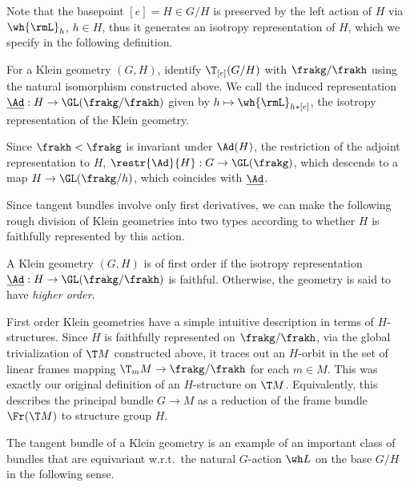 Note that the basepoint $[e]=H\in G\slash H$ is preserved by the left action of $H$ via $\wh{\rmL}_h$, $h\in H$, thus it generates an isotropy representation of $H$, which we specify in the following definition.

\begin{defn}
    For a Klein geometry $(G,H)$, identify $\T_{[e]}(G\slash H)$ with $\frakg\slash\frakh$ using the natural isomorphism constructed above. We call the induced representation $\underline{\Ad}:H\to \GL(\frakg\slash\frakh)$ given by $h\mapsto \wh{\rmL}_{h\ast [e]}$, the isotropy representation of the Klein geometry.

    Since $\frakh<\frakg$ is invariant under $\Ad(H)$, the restriction of the adjoint representation to $H$, $\restr{\Ad}{H}:G\to \GL(\frakg)$, which descends to a map $H\to \GL(\frakg\slash h)$, which coincides with $\underline{\Ad}$.
\end{defn}

Since tangent bundles involve only first derivatives, we can make the following rough division of Klein geometries into two types according to whether $H$ is faithfully represented by this action.

\begin{defn}
    A Klein geometry $(G,H)$ is of first order if the isotropy representation $\underline{\Ad}:H\to \GL(\frakg\slash\frakh)$ is faithful. Otherwise, the geometry is said to have \emph{higher order}.
\end{defn}

\begin{rem}
    First order Klein geometries have a simple intuitive description in terms of $H$-structures. Since $H$ is faithfully represented on $\frakg\slash\frakh$, via the global trivialization of $\T M$ constructed above, it traces out an $H$-orbit in the set of linear frames mapping $\T_mM\to \frakg\slash\frakh$ for each $m\in M$. This was exactly our original definition of an $H$-structure on $\T M$. Equivalently, this describes the principal bundle $G\to M$ as a reduction of the frame bundle $\Fr(\T M)$ to structure group $H$.
\end{rem}

The tangent bundle of a Klein geometry is an example of an important class of bundles that are equivariant w.r.t.\ the natural $G$-action $\wh L$ on the base $G\slash H$ in the following sense.


